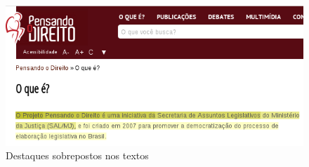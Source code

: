     \begin{figure}[htb]%
        \begin{center}
            \includegraphics[scale=0.7]{./imagens/hypotesis-highlight.png}%
        \end{center}%
        \caption{Destaques sobrepostos nos textos\label{fig:hypotesis-highlight}}%
    \end{figure}%

